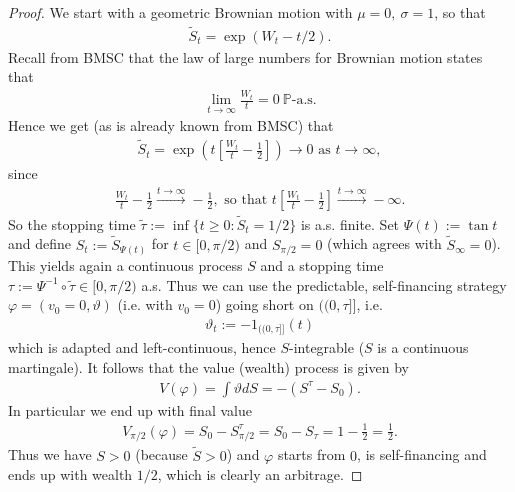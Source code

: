 \documentclass[12pt,a4paper, twoside]{article}
\theoremstyle{definition}
\newcommand{\PP}{\mathbb{P}} %
\begin{document}
\begin{proof}
We start with a geometric Brownian motion with $\mu=0, \ \sigma=1$, so that \begin{align*}
\widetilde{S}_t= \exp \left( W_t - t/2\right).
\end{align*}
Recall from BMSC that the law of large numbers for Brownian motion states that 
\begin{align*}
\lim_{t \to \infty} \frac{W_t}{t}=0 \ \PP\text{-a.s.}
\end{align*}
Hence we get (as is already known from BMSC) that
\begin{align*}
\widetilde{S}_t = \exp \left( t \left[ \frac{W_t}{t}- \frac{1}{2}\right] \right) \to 0 \text{ as } t \to \infty,
\end{align*}
since
\begin{align*}
\frac{W_t}{t}- \frac{1}{2} \xrightarrow{t \to \infty} - \frac{1}{2}, \text{ so that } t \left[ \frac{W_t}{t} - \frac{1}{2}\right] \xrightarrow{ t \to \infty} - \infty.
\end{align*}
So the stopping time $ \widetilde{\tau} := \inf\{ t \geq 0 : \widetilde{S}_t = 1/2\}$ is a.s. finite. Set $\Psi(t):= \tan t$ and define $S_t:= \widetilde{S}_{ \Psi (t)}$ for $t \in [0, \pi/2)$ and $S_{ \pi/2} =0$ (which agrees with $\widetilde{S}_\infty =0$). This yields again a continuous process $S$ and a stopping time $\tau := \Psi^{-1}\circ \widetilde{\tau} \in [0, \pi/2)$ a.s. Thus we can use the predictable, self-financing strategy $\varphi = (v_0=0, \vartheta)$  (i.e. with $v_0=0$) going short on $(\!(0, \tau ]\!]$,  i.e.  \begin{align*}
\vartheta_t := - 1_{(\!( 0, \tau]\!]} (t)
\end{align*}
which is adapted and left-continuous, hence $S$-integrable ($S$ is a continuous martingale). It follows that the value (wealth) process is given by
\begin{align*}
V( \varphi)= \int \vartheta dS = -(S^\tau - S_0).
\end{align*}
In particular we end up with final value
\begin{align*}
V_{ \pi/2} ( \varphi)= S_0 - S_{ \pi/2}^\tau = S_0 -S_\tau = 1- \frac{1}{2}= \frac{1}{2}.
\end{align*}
Thus we have $S >0$ (because $\widetilde{S} >0$)  and $\varphi$ starts from $0$, is self-financing and ends up with wealth $1/2$, which is clearly an  arbitrage.
\end{proof}
\end{document}

